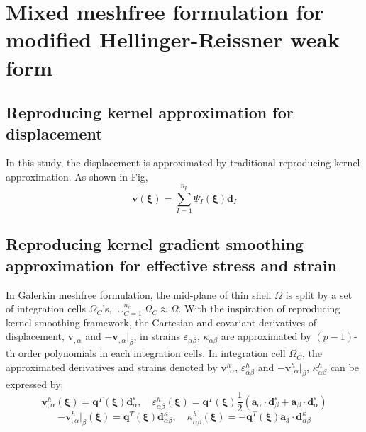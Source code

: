 \section{Mixed meshfree formulation for modified Hellinger-Reissner weak form}
\subsection{Reproducing kernel approximation for displacement}
In this study, the displacement is approximated by traditional reproducing kernel approximation. As shown in Fig, 
\begin{equation}\label{approxv}
\boldsymbol v(\boldsymbol \xi) = \sum_{I=1}^{n_p} \Psi_I(\boldsymbol \xi) \boldsymbol d_I
\end{equation}

\subsection{Reproducing kernel gradient smoothing approximation for effective stress and strain}
In Galerkin meshfree formulation, the mid-plane of thin shell $\Omega$ is split by a set of integration cells $\Omega_C$'s, $\cup_{C=1}^{n_e}\Omega_C\approx \Omega$. With the inspiration of reproducing kernel smoothing framework, the Cartesian and covariant derivatives of displacement, $\boldsymbol v_{,\alpha}$ and $-\boldsymbol v_{,\alpha}\vert_\beta$, in strains $\varepsilon_{\alpha\beta}$, $\kappa_{\alpha\beta}$ are approximated by $(p-1)$-th order polynomials in each integration cells. In integration cell $\Omega_C$, the approximated derivatives and strains denoted by $\boldsymbol v^h_{,\alpha}$, $\varepsilon^h_{\alpha\beta}$ and $-\boldsymbol v^h_{,\alpha}\vert_\beta$, $\kappa^h_{\alpha\beta}$ can be expressed by:
\begin{equation}\label{approxsn1}
    \boldsymbol v^h_{,\alpha}(\boldsymbol \xi) = \boldsymbol q^T(\boldsymbol \xi) \boldsymbol d_{\alpha}^\varepsilon, \quad
    \varepsilon^h_{\alpha\beta}(\boldsymbol \xi) = \boldsymbol q^T(\boldsymbol \xi) \frac{1}{2}(\boldsymbol a_\alpha \cdot \boldsymbol d_{\beta}^\varepsilon + \boldsymbol a_\beta \cdot \boldsymbol d_{\alpha}^\varepsilon)
\end{equation}
\begin{equation}\label{approxsn2}
    -\boldsymbol v^h_{,\alpha}\vert_\beta(\boldsymbol \xi) = \boldsymbol q^T(\boldsymbol \xi) \boldsymbol d_{\alpha\beta}^\kappa , \quad
    \kappa^h_{\alpha\beta}(\boldsymbol \xi) = - \boldsymbol q^T(\boldsymbol \xi) \boldsymbol a_3 \cdot \boldsymbol d_{\alpha\beta}^\kappa
\end{equation}
